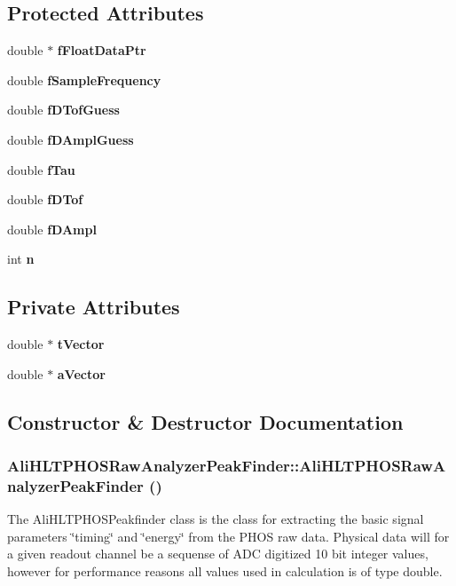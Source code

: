 \subsection*{Protected Attributes}
\begin{CompactItemize}
\item 
double $\ast$ {\bf f\-Float\-Data\-Ptr}
\item 
double {\bf f\-Sample\-Frequency}
\item 
double {\bf f\-DTof\-Guess}
\item 
double {\bf f\-DAmpl\-Guess}
\item 
double {\bf f\-Tau}
\item 
double {\bf f\-DTof}
\item 
double {\bf f\-DAmpl}
\item 
int {\bf n}
\end{CompactItemize}
\subsection*{Private Attributes}
\begin{CompactItemize}
\item 
double $\ast$ {\bf t\-Vector}
\item 
double $\ast$ {\bf a\-Vector}
\end{CompactItemize}


\subsection{Constructor \& Destructor Documentation}
\subsubsection{\setlength{\rightskip}{0pt plus 5cm}Ali\-HLTPHOSRaw\-Analyzer\-Peak\-Finder::Ali\-HLTPHOSRaw\-Analyzer\-Peak\-Finder ()}\label{classAliHLTPHOSRawAnalyzerPeakFinder_AliHLTPHOSRawAnalyzerPeakFindera0}


The Ali\-HLTPHOSPeakfinder class is the class for extracting the basic signal parameters \char`\"{}timing\char`\"{} and \char`\"{}energy\char`\"{} from the PHOS raw data. Physical data will for a given readout channel be a sequense of ADC digitized 10 bit integer values, however for performance reasons all values used in calculation is of type double. 

